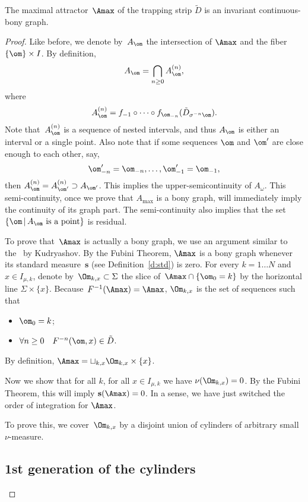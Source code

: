 \documentclass[a4paper,12pt]{amsart}
\begin{document}
\begin{Prop}\label{p:Markov-bony}
The maximal attractor~$\Amax$ of the trapping strip $\tilde D$ is an invariant continuous-bony graph.
\end{Prop}
\begin{proof}

Like before, we denote by~$A_\om$ the intersection of $\Amax$ and the fiber $\{ \om \} \times I$. By definition,
$$
A_\om = \bigcap_{n \ge 0} A_\om^{(n)},
$$
where
$$
A_\om^{(n)} = f_{-1} \circ \dots \circ f_{\om_{-n}} (\tilde D_{\sigma^{-n} \om}).
$$
Note that~$A_\om^{(n)}$ is a sequence of nested intervals, and thus $A_\om$ is either an interval or a single point. Also note that if some sequences $\om$ and $\om'$ are close enough to each other, say,
$$
\om_{-n}' = \om_{-n}, \dots, \om_{-1}' = \om_{-1},
$$
then $A_\om^{(n)} = A_{\om'}^{(n)} \supset A_{\om'}$.
This implies the upper-semicontinuity of $A_{\omega}$. This semi-continuity, once we prove that $A_{\max}$ is a bony graph, will immediately imply the continuity of its graph part. The semi-continuity also implies that the set $\{ \om\,|\, A_\om \text{ is a point}\}$ is residual.

To prove that~$\Amax$ is actually a bony graph, we use an argument similar to the~\cite[Theorem 3]{Kudryashov2010} by Kudryashov. By the Fubini Theorem, $\Amax$ is a bony graph whenever its standard measure~$\mathbf{s}$ (see Definition~\ref{d:std}) is zero. For every $k = 1 \dots N$ and $x \in I_{\mu,k}$, denote by~$\Om_{k,x} \subset \Sigma$ the slice of~$\Amax \cap \{ \om_0 = k\}$ by the horizontal line $\Sigma \times \{x\}$. Because~$F^{-1}(\Amax) = \Amax$, $\Om_{k,x}$ is the set of sequences such that
\begin{itemize}
  \item $\om_0 = k$;
  \item $\forall n \ge 0 \quad F^{-n} (\om,x) \in \tilde D$.
\end{itemize}
By definition, $\Amax = \sqcup_{k,x} \Om_{k,x} \times \{x\}$.

Now we show that for all $k$, for all $x \in I_{\mu,k}$ we have $\nu(\Om_{k,x}) = 0$.
By the Fubini Theorem, this will imply $\mathbf{s}(\Amax) = 0$. In a sense, we have just switched the order of integration for $\Amax$. 

To prove this, we cover~$\Om_{k,x}$ by a disjoint union of cylinders of arbitrary small $\nu$-measure.

\subsection*{1st generation of the cylinders}


\end{proof}
\end{document}
